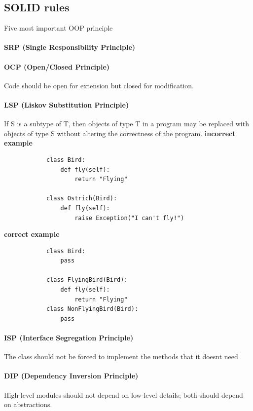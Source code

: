 \subsection{SOLID rules}
    Five most important OOP principle
    
    \paragraph{SRP (Single Responsibility Principle)}
    
    \paragraph{OCP (Open/Closed Principle)}
        Code should be open for extension but closed for modification.
    
    \paragraph{LSP (Liskov Substitution Principle)}
        If S is a subtype of T, then objects of type T in a program may be replaced with objects of type S without altering the correctness of the program.
        \textbf{incorrect example}
        \begin{verbatim}
            class Bird:
                def fly(self):
                    return "Flying"

            class Ostrich(Bird):
                def fly(self):
                    raise Exception("I can't fly!")
        \end{verbatim}
        
        \textbf{correct example}
        \begin{verbatim}
            class Bird:
                pass

            class FlyingBird(Bird):
                def fly(self):
                    return "Flying"
            class NonFlyingBird(Bird):
                pass
        \end{verbatim}
    
    \paragraph{ISP (Interface Segregation Principle)}
        The class should not be forced to implement the methods that it doesnt need
    
    \paragraph{DIP (Dependency Inversion Principle)}
        High-level modules should not depend on low-level details; both should depend on abstractions.

